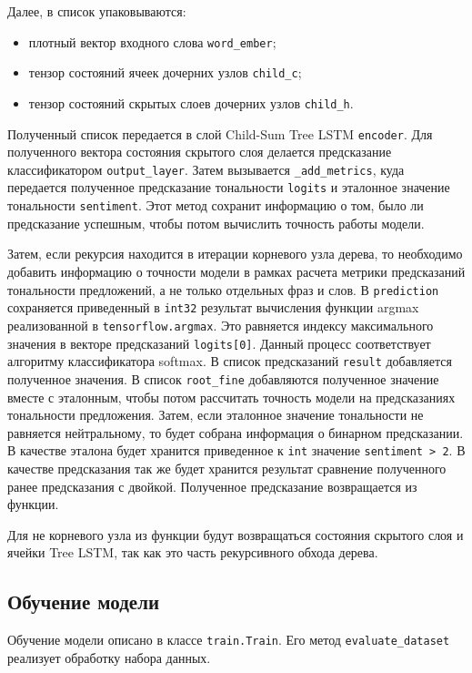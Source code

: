 Далее, в список упаковываются:
\begin{itemize}
\item плотный вектор входного слова \texttt{word\_ember};
\item тензор состояний ячеек дочерних узлов \texttt{child\_c};
\item тензор состояний скрытых слоев дочерних узлов \texttt{child\_h}.
\end{itemize}

Полученный список передается в слой Child-Sum Tree LSTM \texttt{encoder}. Для полученного вектора состояния скрытого слоя делается предсказание классификатором \texttt{output\_layer}. Затем вызывается \texttt{\_add\_metrics}, куда передается полученное предсказание тональности \texttt{logits} и эталонное значение тональности \texttt{sentiment}. Этот метод сохранит информацию о том, было ли предсказание успешным, чтобы потом вычислить точность работы модели.

Затем, если рекурсия находится в итерации корневого узла дерева, то необходимо добавить информацию о точности модели в рамках расчета метрики предсказаний тональности предложений, а не только отдельных фраз и слов. В \texttt{prediction} сохраняется приведенный в \texttt{int32} результат вычисления функции argmax реализованной в \texttt{tensorflow.argmax}. Это равняется индексу максимального значения в векторе предсказаний \texttt{logits[0]}. Данный процесс соответствует алгоритму классификатора softmax. В список предсказаний \texttt{result} добавляется полученное значения. В список \texttt{root\_\-fine} добавляются полученное значение вместе с эталонным, чтобы потом рассчитать точность модели на предсказаниях тональности предложения. Затем, если эталонное значение тональности не равняется нейтральному, то будет собрана информация о бинарном предсказании. В качестве эталона будет хранится приведенное к \texttt{int} значение \texttt{sentiment > 2}. В качестве предсказания так же будет хранится результат сравнение полученного ранее предсказания с двойкой. Полученное предсказание возвращается из функции.

Для не корневого узла из функции будут возвращаться состояния скрытого слоя и ячейки Tree LSTM, так как это часть рекурсивного обхода дерева.

\subsection{Обучение модели}
Обучение модели описано в классе \texttt{train.Train}. Его метод \texttt{eva\-lua\-te\_dataset} реализует обработку набора данных.

